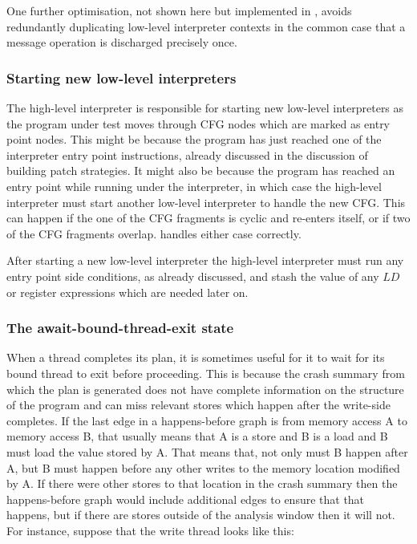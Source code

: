 One further optimisation, not shown here but implemented in
{\implementation}, avoids redundantly duplicating low-level
interpreter contexts in the common case that a message operation is
discharged precisely once.


\subsubsection{Starting new low-level interpreters}

The high-level interpreter is responsible for starting new low-level
interpreters as the program under test moves through CFG nodes which
are marked as entry point nodes.  This might be because the program
has just reached one of the interpreter entry point instructions,
already discussed in the discussion of building patch strategies.  It
might also be because the program has reached an entry point while
running under the interpreter, in which case the high-level
interpreter must start another low-level interpreter to handle the new
CFG.  This can happen if the one of the CFG fragments is
cyclic and re-enters itself, or if two of the CFG fragments
overlap.  {\Implementation} handles either case correctly.

After starting a new low-level interpreter the high-level interpreter
must run any entry point side conditions, as already discussed, and
stash the value of any $LD$ or register expressions which are needed
later on.

\subsubsection{The await-bound-thread-exit state}

When a thread completes its plan, it is sometimes useful for it to
wait for its bound thread to exit before proceeding.  This is because
the crash summary from which the plan is generated does not have
complete information on the structure of the program and can miss
relevant stores which happen after the write-side {\StateMachine}
completes.  If the last edge in a happens-before graph is from memory
access A to memory access B, that usually means that A is a store and
B is a load and B must load the value stored by A.  That means that,
not only must B happen after A, but B must happen before any other
writes to the memory location modified by A.  If there were other
stores to that location in the crash summary then the happens-before
graph would include additional edges to ensure that that happens, but
if there are stores outside of the analysis window then it will not.
For instance, suppose that the write thread looks like this:

